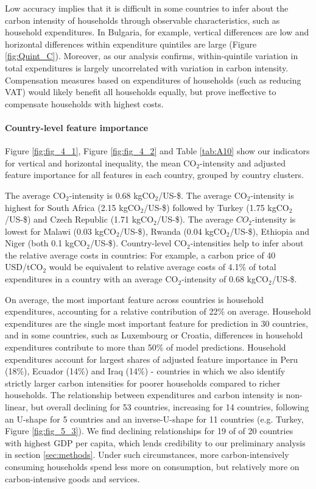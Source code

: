 \documentclass[12pt, a4paper]{article}
\begin{document}
Low accuracy implies that it is difficult in some countries to infer about the carbon intensity of households through observable characteristics, such as household expenditures. In Bulgaria, for example, vertical differences are low and horizontal differences within expenditure quintiles are large (Figure \ref{fig:Quint_C}). Moreover, as our analysis confirms, within-quintile variation in total expenditures is largely uncorrelated with variation in carbon intensity. Compensation measures based on expenditures of households (such as reducing VAT) would likely benefit all households equally, but prove ineffective to compensate households with highest costs.

\paragraph{Country-level feature importance}

Figure \ref{fig:fig_4_1}, Figure \ref{fig:fig_4_2} and Table \ref{tab:A10} show our indicators for vertical and horizontal inequality, the mean CO$_{2}$-intensity and adjusted feature importance for all features in each country, grouped by country clusters. %

The average CO$_{2}$-intensity is 0.68 kgCO$_{2}$/US-\$. The average CO$_{2}$-intensity is highest for South Africa (2.15 kgCO$_{2}$/US-\$) followed by Turkey (1.75 kgCO$_{2}$/US-\$) and Czech Republic (1.71 kgCO$_{2}$/US-\$). The average $CO_{2}$-intensity is lowest for Malawi (0.03 kgCO$_{2}$/US-\$), Rwanda (0.04 kgCO$_{2}$/US-\$), Ethiopia and Niger (both 0.1 kgCO$_{2}$/US-\$). Country-level CO$_{2}$-intensities help to infer about the relative average costs in countries: For example, a carbon price of 40 USD/tCO$_{2}$ \autocite{Stiglitz.2017} would be equivalent to relative average costs of 4.1\% of total expenditures in a country with an average CO$_{2}$-intensity of 0.68 kgCO$_{2}$/US-\$.

On average, the most important feature across countries is household expenditures, accounting for a relative contribution of 22\% on average. Household expenditures are the single most important feature for prediction in 30 countries, and in some countries, such as Luxembourg or Croatia, differences in household expenditures contribute to more than 50\% of model predictions. Household expenditures account for largest shares of adjusted feature importance in Peru (18\%), Ecuador (14\%) and Iraq (14\%) - countries in which we also identify strictly larger carbon intensities for poorer households compared to richer households. The relationship between expenditures and carbon intensity is non-linear, but overall declining for 53 countries, increasing for 14 countries, following an U-shape for 5 countries and an inverse-U-shape for 11 countries (e.g. Turkey, Figure \ref{fig:fig_5_3}). We find declining relationships for 19 of of 20 countries with highest GDP per capita, which lends credibility to our preliminary analysis in section \ref{sec:methods}. Under such circumstances, more carbon-intensively consuming households spend less more on consumption, but relatively more on carbon-intensive goods and services.
\end{document}
